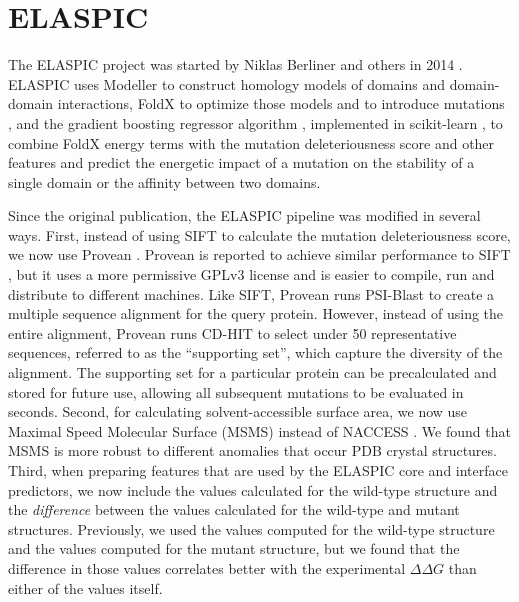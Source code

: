 \clearpage
\section{ELASPIC} \label{sec:elaspic}

The ELASPIC project was started by Niklas Berliner and others in 2014 \cite{berliner_combining_2014}. ELASPIC uses Modeller \cite{webb_comparative_2002} to construct homology models of domains and domain-domain interactions, FoldX to optimize those models and to introduce mutations \cite{schymkowitz_foldx_2005}, and the gradient boosting regressor algorithm \cite{berliner_combining_2014}, implemented in scikit-learn \cite{scikit-learn}, to combine FoldX energy terms with the mutation deleteriousness score and other features and predict the energetic impact of a mutation on the stability of a single domain or the affinity between two domains.

Since the original publication, the ELASPIC pipeline was modified in several ways. First, instead of using SIFT \cite{ng_sift:_2003} to calculate the mutation deleteriousness score, we now use Provean \cite{choi_predicting_2012}. Provean is reported to achieve similar performance to SIFT \cite{choi_predicting_2012}, but it uses a more permissive GPLv3 license and is easier to compile, run and distribute to different machines. Like SIFT, Provean runs PSI-Blast to create a multiple sequence alignment for the query protein. However, instead of using the entire alignment, Provean runs CD-HIT to select under 50 representative sequences, referred to as the ``supporting set'', which capture the diversity of the alignment. The supporting set for a particular protein can be precalculated and stored for future use, allowing all subsequent mutations to be evaluated in seconds. Second, for calculating solvent-accessible surface area, we now use Maximal Speed Molecular Surface (MSMS) \cite{sanner_fast_1995} instead of NACCESS \cite{hubbard_naccess_1993}. We found that MSMS is more robust to different anomalies that occur PDB crystal structures. Third, when preparing features that are used by the ELASPIC core and interface predictors, we now include the values calculated for the wild-type structure and the \textit{difference} between the values calculated for the wild-type and mutant structures. Previously, we used the values computed for the wild-type structure and the values computed for the mutant structure, but we found that the difference in those values correlates better with the experimental $\Delta \Delta G$ than either of the values itself.

